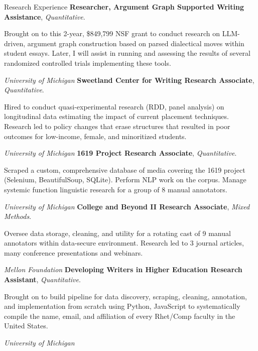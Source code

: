 \begin{rubric}{Research Experience}
    \entry*[2024 -- ]%
        \textbf{Researcher, Argument Graph Supported Writing Assistance}, \textit{Quantitative}.
        \par Brought on to this 2-year, \$849,799 NSF grant to conduct research on LLM-driven, argument graph construction based on parsed dialectical moves within student essays. Later, I will assist in running and assessing the results of several randomized controlled trials implementing these tools.
        \par\emph{University of Michigan}
    \entry*[2019 -- 2023]%
        \textbf{Sweetland Center for Writing Research Associate}, \textit{Quantitative}.
        \par Hired to conduct quasi-experimental research (RDD, panel analysis) on longitudinal data estimating the impact of current placement techniques. Research led to policy changes that erase structures that resulted in poor outcomes for low-income, female, and minoritized students.
        \par\emph{University of Michigan}
    \entry*[2022 -- 2023]%
        \textbf{1619 Project Research Associate}, \textit{Quantitative}.
        \par Scraped a custom, comprehensive database of media covering the 1619 project (Selenium, BeautifulSoup, SQLite). Perform NLP work on the corpus. Manage systemic function linguistic research for a group of 8 manual annotators.
        \par\emph{University of Michigan}
    \entry*[2019 -- 2023]%
        \textbf{College and Beyond II Research Associate}, \textit{Mixed Methods}.
        \par Oversee data storage, cleaning, and utility for a rotating cast of 9 manual annotators within data-secure environment. Research led to 3 journal articles, many conference presentations and webinars.
        \par\emph{Mellon Foundation}
    \entry*[2019]%
        \textbf{Developing Writers in Higher Education Research Assistant}, \textit{Quantitative}.
        \par Brought on to build pipeline for data discovery, scraping, cleaning, annotation, and implementation from scratch using Python, JavaScript to systematically compile the name, email, and affiliation of every Rhet/Comp faculty in the United States.
        \par\emph{University of Michigan}
\end{rubric}